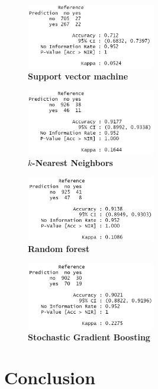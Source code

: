 \documentclass{article}
\begin{document}
\begin{figure}[h]
\caption{\textbf{Support vector machine}}
\centering
\includegraphics[width = 0.5\textwidth]{svmCmtx.png}
\end{figure}

\begin{figure}[h]
\caption{\textbf{$k$-Nearest Neighbors}}
\centering
\includegraphics[width = 0.5\textwidth]{knnCmtx.png}
\end{figure}

\begin{figure}[h]
\caption{\textbf{Random forest}}
\centering
\includegraphics[width = 0.5\textwidth]{rfCmtx.png}
\end{figure}

\begin{figure}[h]
\caption{\textbf{Stochastic Gradient Boosting}}
\centering
\includegraphics[width = 0.5\textwidth]{gbmCmtx.png}
\end{figure}

\section{Conclusion}
\end{document}
